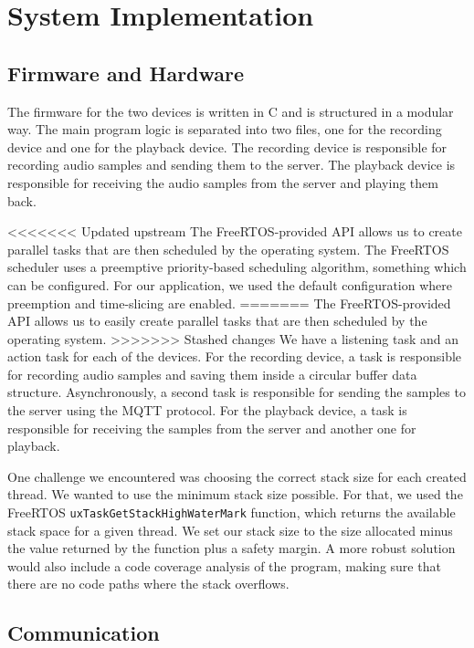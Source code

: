 \documentclass[conference]{IEEEtran}
\begin{document}
\section{System Implementation}
\label{sec:system_implementation}

\subsection{Firmware and Hardware}

The firmware for the two devices is written in C and is structured in a modular way.
The main program logic is separated into two files, one for the recording device and one for the playback device.
The recording device is responsible for recording audio samples and sending them to the server.
The playback device is responsible for receiving the audio samples from the server and playing them back.

<<<<<<< Updated upstream
The FreeRTOS-provided API allows us to create parallel tasks that are then scheduled by the operating system.
The FreeRTOS scheduler uses a preemptive priority-based scheduling algorithm\cite{FreeRTOS_Scheduling}, something which can be configured.
For our application, we used the default configuration where preemption and time-slicing are enabled.
=======
The FreeRTOS-provided API allows us to easily create parallel tasks that are then scheduled by the operating system.
>>>>>>> Stashed changes
We have a listening task and an action task for each of the devices.
For the recording device, a task is responsible for recording audio samples and saving them 
inside a circular buffer data structure. Asynchronously, a second task is responsible for
sending the samples to the server using the MQTT protocol.
For the playback device, a task is responsible for receiving the samples from the server
and another one for playback.

One challenge we encountered was choosing the correct stack size for each created thread.
We wanted to use the minimum stack size possible.
For that, we used the FreeRTOS \texttt{uxTaskGetStackHighWaterMark} function, which returns
the available stack space for a given thread.
We set our stack size to the size allocated minus the value returned by the function plus a safety margin.
A more robust solution would also include a code coverage analysis\cite{CodeCoverage} of the program,
making sure that there are no code paths where the stack overflows.

\subsection{Communication}
\end{document}

